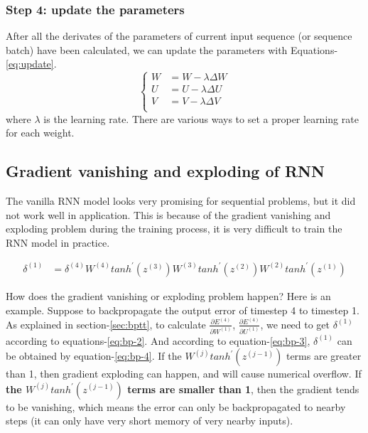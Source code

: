 \documentclass[english]{article}
\begin{document}
\subsubsection{Step 4: update the parameters} 
After all the derivates of the parameters of current input sequence (or sequence batch) have been calculated, we can update the parameters with Equations-\ref{eq:update}.
\begin{equation}\label{eq:update}\begin{cases}
W &= W  - \lambda \Delta W\\
U &= U - \lambda \Delta U\\
V &= V - \lambda \Delta V\\
\end{cases}\end{equation}
where $\lambda$ is the learning rate. There are various ways to set a proper learning rate for each weight.


\subsection{Gradient vanishing and exploding of RNN}
The vanilla RNN model looks very promising for sequential problems, but it did not work well in application.  
This is because of the gradient vanishing and exploding problem during the training process, it is very difficult to train the RNN model in practice.

\begin{align}\label{eq:bp-4}
\delta^{(1)} &= \delta^{(4)} W^{(4)} tanh^{\prime}(z^{(3)}) W^{(3)} tanh^{\prime}(z^{(2)}) W^{(2)} tanh^{\prime}(z^{(1)})
\end{align}


How does the gradient vanishing or exploding problem happen? Here is an example. 
Suppose to backpropagate the output error of timestep 4 to timestep 1. As explained in section-\ref{sec:bptt},  to calculate $\frac{\partial E^{(4)}}{\partial W^{(1)}}$,  $\frac{\partial E^{(4)}}{\partial U^{(1)}}$, we need to get $\delta^{(1)}$ according to equations-\ref{eq:bp-2}. And according to equation-\ref{eq:bp-3}, $\delta^{(1)}$ can be obtained by equation-\ref{eq:bp-4}. If the $W^{(j)}tanh^{\prime}(z^{(j-1)})$ terms are greater than 1, then gradient exploding can happen, and will cause numerical overflow. If \textbf{the $W^{(j)}tanh^{\prime}(z^{(j-1)})$ terms  are smaller than 1}, 
then the gradient tends to be vanishing, which means the error can only be backpropagated to nearby steps (it can only have very short memory of very nearby inputs). 
\end{document}
